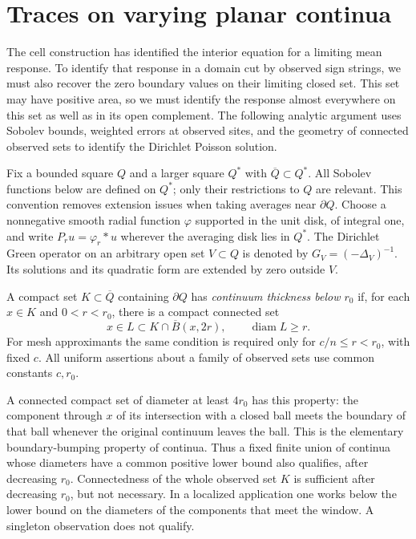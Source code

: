 \section{Traces on varying planar continua}\label{sec:trace-analysis}

The cell construction has identified the interior equation for a limiting
mean response. To identify that response in a domain cut by observed sign
strings, we must also recover the zero boundary values on their limiting
closed set. This set may have positive area, so we must identify the
response almost everywhere on this set as well as in its open complement. The following
analytic argument uses Sobolev bounds, weighted errors at observed sites,
and the geometry of connected observed sets to identify the Dirichlet
Poisson solution.

Fix a bounded square $Q$ and a larger square $Q^*$ with
$\overline Q\subset Q^*$.  All Sobolev functions below are defined on $Q^*$;
only their restrictions to $Q$ are relevant.  This convention removes
extension issues when taking averages near $\partial Q$.  Choose a
nonnegative smooth radial function $\varphi$ supported in the unit disk,
of integral one, and write $P_ru=\varphi_r*u$ wherever the averaging disk
lies in $Q^*$.  The Dirichlet Green operator on an arbitrary open set
$V\subset Q$ is denoted by $G_V=(-\Delta_V)^{-1}$.  Its solutions and its
quadratic form are extended by zero outside $V$.

\begin{definition}\label{t:thickness}
A compact set $K\subset\overline Q$ containing $\partial Q$ has
\emph{continuum thickness below $r_0$} if, for each $x\in K$ and
$0<r<r_0$, there is a compact connected set
\[
 x\in L\subset K\cap\overline B(x,2r),\qquad
 \operatorname{diam}L\ge r.
\]
For mesh approximants the same condition is required only for
$c/n\le r<r_0$, with fixed $c$.  All uniform assertions about a family of
observed sets use common constants $c,r_0$.
\end{definition}

A connected compact set of diameter at least $4r_0$ has this property:
the component through $x$ of its intersection with a closed ball meets the
boundary of that ball whenever the original continuum leaves the ball.
This is the elementary boundary-bumping property of continua.  Thus a
fixed finite union of continua whose diameters have a common positive
lower bound also qualifies, after decreasing $r_0$.  Connectedness of the
whole observed set $K$ is sufficient after decreasing $r_0$, but not
necessary.  In a localized
application one works below the lower bound on the diameters of the
components that meet the window.  A singleton observation does not qualify.

